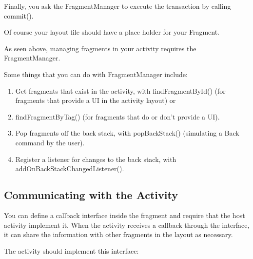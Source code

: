 Finally, you ask the FragmentManager to execute the transaction by calling commit().



Of course your layout file should have a place holder for your Fragment.



As seen above, managing fragments in your activity requires the FragmentManager. 

Some things that you can do with FragmentManager include:

\begin{enumerate}
	\item Get fragments that exist in the activity, with findFragmentById() (for fragments that provide a UI in the activity layout) or \item findFragmentByTag() (for fragments that do or don't provide a UI).
	\item Pop fragments off the back stack, with popBackStack() (simulating a Back command by the user).
	\item Register a listener for changes to the back stack, with addOnBackStackChangedListener().
\end{enumerate}

\subsection{Communicating with the Activity}
You can  define a callback interface inside the fragment and require that the host activity implement it. When the activity receives a callback through the interface, it can share the information with other fragments in the layout as necessary.



The activity should implement this interface:


